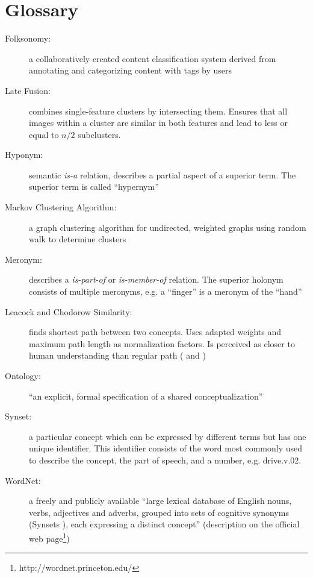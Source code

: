 \section{Glossary} %

\begin{description}
\item[Folksonomy:] a collaboratively created content classification system derived from annotating and categorizing content with tags by users

\item[Late Fusion:] combines single-feature clusters by intersecting them. Ensures that all images within a cluster are similar in both features and lead to less or equal to $n/2$ subclusters.

\item[Hyponym:] semantic \emph{is-a} relation, describes a partial aspect of a superior term. The superior term is called ``hypernym''

\item[Markov Clustering Algorithm:] a graph clustering algorithm for undirected, weighted graphs using random walk to determine clusters

\item[Meronym:] describes a \emph{is-part-of} or \emph{is-member-of} relation. The superior holonym consists of multiple meronyms, e.g. a ``finger'' is a meronym of the ``hand''

\item[Leacock and Chodorow Similarity:] finds shortest path between two concepts. Uses adapted weights and maximum path length as normalization factors. Is perceived as closer to human understanding than regular path (\cite{budanitsky01} and \cite{pedersen2004wordnet})

\item[Ontology:] ``an explicit, formal specification of a shared conceptualization'' \cite{gruber1993translation}

\item[Synset:] a particular concept which can be expressed by different terms but has one unique identifier. This identifier consists of the word most commonly used to describe the concept, the part of speech, and a number, e.g. drive.v.02.

\item[WordNet:] a freely and publicly available ``large lexical database of English nouns, verbs, adjectives and adverbs, grouped into sets of cognitive synonyms (Synsets ), each expressing a distinct concept'' (description on the official web page\footnote{http://wordnet.princeton.edu/})

\end{description}


